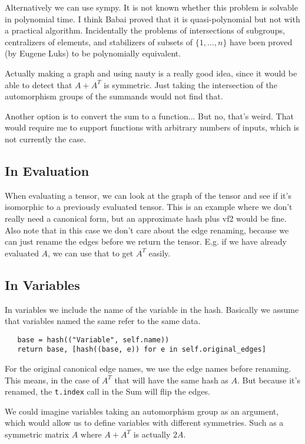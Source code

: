 Alternatively we can use sympy.
It is not known whether this problem is solvable in polynomial time. I think Babai proved that it is quasi-polynomial but not with a practical algorithm. Incidentally the problems of intersections of subgroups, centralizers of elements, and stabilizers of subsets of $\{1, \dots, n\}$ have been proved (by Eugene Luks) to be polynomially equivalent.


Actually making a graph and using nauty is a really good idea, since it would
be able to detect that $A+A^T$ is symmetric.
Just taking the intersection of the automorphism groups of the summands would not find that.

Another option is to convert the sum to a function...
But no, that's weird.
That would require me to support functions with arbitrary numbers of inputs, which is not currently the case.



\subsection{In Evaluation}
When evaluating a tensor, we can look at the graph of the tensor and see if it's isomorphic to a previously evaluated tensor.
This is an example where we don't really need a canonical form, but an approximate hash plus vf2 would be fine.
Also note that in this case we don't care about the edge renaming, because we can just rename the edges before we return the tensor.
E.g. if we have already evaluated $A$, we can use that to get $A^T$ easily.

\subsection{In Variables}
In variables we include the name of the variable in the hash.
Basically we assume that variables named the same refer to the same data.
\begin{lstlisting}
   base = hash(("Variable", self.name))
   return base, [hash((base, e)) for e in self.original_edges]
\end{lstlisting}
For the original canonical edge names, we use the edge names before renaming.
This means, in the case of $A^T$ that will have the same hash as $A$.
But because it's renamed, the \texttt{t.index} call in the Sum will flip the edges.

We could imagine variables taking an automorphism group as an argument, which would allow us to define variables with different symmetries.
Such as a symmetric matrix $A$ where $A+A^T$ is actually $2A$.


